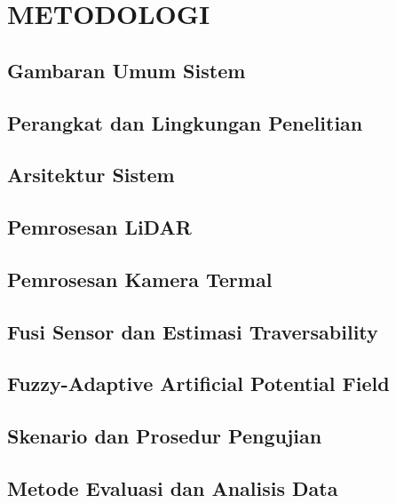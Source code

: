 \chapter{METODOLOGI}
\label{chap:metodologi}

\section{Gambaran Umum Sistem}
\label{sec:gambaran_umum_sistem}


\section{Perangkat dan Lingkungan Penelitian}
\label{sec:perangkat_dan_lingkungan}


\section{Arsitektur Sistem}
\label{sec:arsitektur}


\section{Pemrosesan LiDAR}
\label{sec:pemrosesan_lidar}


\section{Pemrosesan Kamera Termal}
\label{sec:pemrosesan_termal}


\section{Fusi Sensor dan Estimasi Traversability}
\label{sec:fusi_traversability}


\section{Fuzzy-Adaptive Artificial Potential Field}
\label{sec:fuzzy_Aapf}


\section{Skenario dan Prosedur Pengujian}
\label{sec:eksperimen}


\section{Metode Evaluasi dan Analisis Data}
\label{sec:evaluasi}


